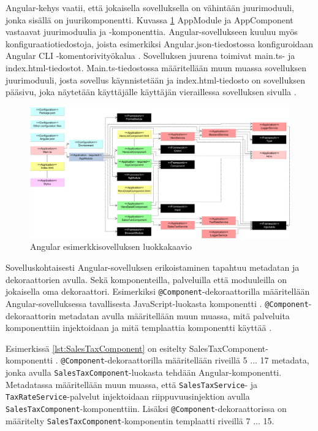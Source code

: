 \documentclass[finnish]{tktltiki2}
\theoremstyle{definition}
\theoremstyle{remark}
\numberwithin{figure}{section}
\begin{document}
Angular-kehys vaatii, että jokaisella sovelluksella on vähintään juurimoduuli, jonka sisällä on juurikomponentti. Kuvassa \ref{fig:UMLDiagramExampleApp} AppModule ja AppComponent vastaavat juurimoduulia ja -komponenttia. Angular-sovellukseen kuuluu myös konfiguraatiotiedostoja, joista esimerkiksi Angular.json-tiedostossa konfiguroidaan Angular CLI -komentorivityökalua \cite{QuickStart}. Sovelluksen juurena toimivat main.ts- ja index.html-tiedostot. Main.ts-tiedostossa määritellään muun muassa sovelluksen juurimoduuli, josta sovellus käynnistetään ja index.html-tiedosto on sovelluksen pääsivu, joka näytetään käyttäjälle käyttäjän vieraillessa sovelluksen sivulla \cite{QuickStart}.

\begin{figure}[H]
  \centering
  \includegraphics[width=14cm]{images/UMLDiagramExampleApp.png}
  \caption{Angular esimerkkisovelluksen luokkakaavio}
  \label{fig:UMLDiagramExampleApp}
\end{figure}

Sovelluskohtaisesti Angular-sovelluksen erikoistaminen tapahtuu metadatan ja dekoraattorien avulla. Sekä komponenteilla, palveluilla että moduuleilla on jokaisella oma dekoraattori. Esimerkiksi \texttt{@Component}-dekoraattorilla määritellään Angular-sovelluksessa tavallisesta JavaScript-luokasta komponentti \cite{ArchitectureComponents}. \texttt{@Component}-dekoraattorin metadatan avulla määritellään muun muassa, mitä palveluita komponenttiin injektoidaan ja mitä templaattia komponentti käyttää \cite{ArchitectureComponents}. 

Esimerkissä \ref{lst:SalesTaxComponent} on esitelty SalesTaxComponent-komponentti \cite{ExampleApplication}. \texttt{@Component}-dekoraattorilla määritellään riveillä 5 ... 17 metadata, jonka avulla \texttt{SalesTaxComponent}-luokasta tehdään Angular-komponentti. Metadatassa määritellään muun muassa, että \texttt{SalesTaxService}- ja \texttt{TaxRateService}-palvelut injektoidaan riippuvuusinjektion avulla \texttt{SalesTaxComponent}-komponenttiin. Lisäksi \texttt{@Component}-dekoraattorissa on määritelty \texttt{SalesTaxComponent}-komponentin templaatti riveillä 7 ... 15. 
\end{document}
